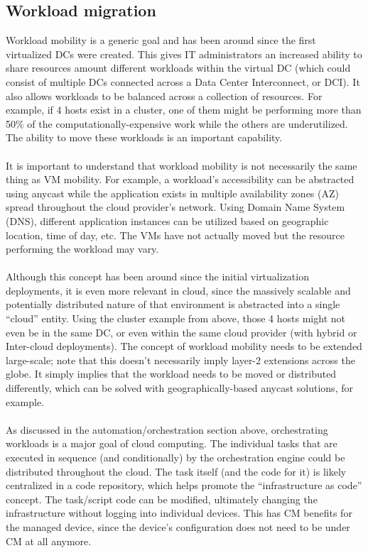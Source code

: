 \subsection{Workload migration}
Workload mobility is a generic goal and has been around since the first
virtualized DCs were created. This gives IT administrators an increased
ability to share resources amount different workloads within the virtual DC
(which could consist of multiple DCs connected across a Data Center
Interconnect, or DCI). It also allows workloads to be balanced across a
collection of resources. For example, if 4 hosts exist in a cluster, one of
them might be performing more than 50\% of the computationally-expensive work
while the others are underutilized. The ability to move these workloads is an
important capability.
\\ \\
It is important to understand that workload mobility is not necessarily the
same thing as VM mobility. For example, a workload’s accessibility can be
abstracted using anycast while the application exists in multiple availability
zones (AZ) spread throughout the cloud provider’s network. Using Domain Name
System (DNS), different application instances can be utilized based on
geographic location, time of day, etc. The VMs have not actually moved but the
resource performing the workload may vary.
\\ \\
Although this concept has been around since the initial virtualization
deployments, it is even more relevant in cloud, since the massively scalable
and potentially distributed nature of that environment is abstracted into a
single ``cloud'' entity. Using the cluster example from above, those 4 hosts
might not even be in the same DC, or even within the same cloud provider (with
hybrid or Inter-cloud deployments). The concept of workload mobility needs to
be extended large-scale; note that this doesn’t necessarily imply layer-2
extensions across the globe. It simply implies that the workload needs to be
moved or distributed differently, which can be solved with
geographically-based anycast solutions, for example.
\\ \\
As discussed in the automation/orchestration section above, orchestrating
workloads is a major goal of cloud computing. The individual tasks that are
executed in sequence (and conditionally) by the orchestration engine could be
distributed throughout the cloud. The task itself (and the code for it) is
likely centralized in a code repository, which helps promote the
``infrastructure as code'' concept. The task/script code can be modified,
ultimately changing the infrastructure without logging into individual
devices. This has CM benefits for the managed device, since the device's
configuration does not need to be under CM at all anymore.
